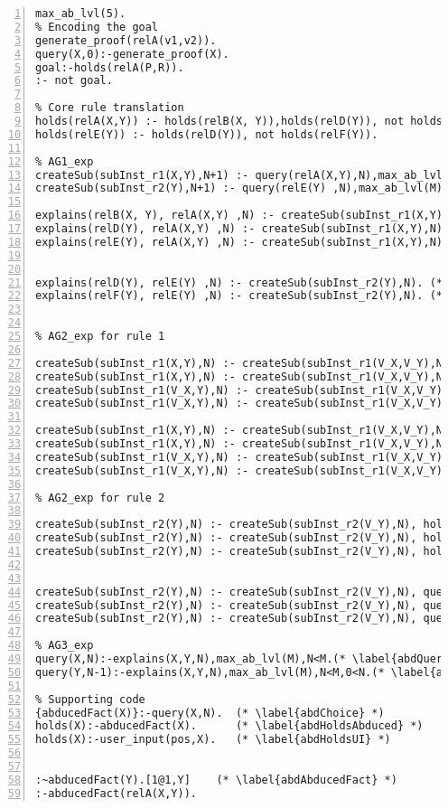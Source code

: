 \documentclass[sigconf]{acmart}
\begin{document}
\begin{lstlisting}[numbers=left]
max_ab_lvl(5).
% Encoding the goal
generate_proof(relA(v1,v2)).
query(X,0):-generate_proof(X).
goal:-holds(relA(P,R)).
:- not goal.

% Core rule translation
holds(relA(X,Y)) :- holds(relB(X, Y)),holds(relD(Y)), not holds(relE(Y)).
holds(relE(Y)) :- holds(relD(Y)), not holds(relF(Y)).

% AG1_exp
createSub(subInst_r1(X,Y),N+1) :- query(relA(X,Y),N),max_ab_lvl(M),N<M-1. (* \label{abdInstR1} *)
createSub(subInst_r2(Y),N+1) :- query(relE(Y) ,N),max_ab_lvl(M),N<M-1. (* \label{abdInstR2} *)

explains(relB(X, Y), relA(X,Y) ,N) :- createSub(subInst_r1(X,Y),N). (* \label{abdExplR1start} *)
explains(relD(Y), relA(X,Y) ,N) :- createSub(subInst_r1(X,Y),N).
explains(relE(Y), relA(X,Y) ,N) :- createSub(subInst_r1(X,Y),N). (* \label{abdExplR1end} *)


explains(relD(Y), relE(Y) ,N) :- createSub(subInst_r2(Y),N). (* \label{abdExplR2start} *)
explains(relF(Y), relE(Y) ,N) :- createSub(subInst_r2(Y),N). (* \label{abdExplR2end} *)


% AG2_exp for rule 1

createSub(subInst_r1(X,Y),N) :- createSub(subInst_r1(V_X,V_Y),N), holds(relA(X,Y)).
createSub(subInst_r1(X,Y),N) :- createSub(subInst_r1(V_X,V_Y),N), holds(relB(X,Y)).
createSub(subInst_r1(V_X,Y),N) :- createSub(subInst_r1(V_X,V_Y),N), holds(relD(Y)).
createSub(subInst_r1(V_X,Y),N) :- createSub(subInst_r1(V_X,V_Y),N), holds(relE(Y)).

createSub(subInst_r1(X,Y),N) :- createSub(subInst_r1(V_X,V_Y),N), query(relA(X,Y),N-1),0<N.
createSub(subInst_r1(X,Y),N) :- createSub(subInst_r1(V_X,V_Y),N), query(relB(X,Y),N).
createSub(subInst_r1(V_X,Y),N) :- createSub(subInst_r1(V_X,V_Y),N), query(relD(Y),N).
createSub(subInst_r1(V_X,Y),N) :- createSub(subInst_r1(V_X,V_Y),N), query(relE(Y),N).

% AG2_exp for rule 2

createSub(subInst_r2(Y),N) :- createSub(subInst_r2(V_Y),N), holds(relE(Y)).
createSub(subInst_r2(Y),N) :- createSub(subInst_r2(V_Y),N), holds(relD(Y)).
createSub(subInst_r2(Y),N) :- createSub(subInst_r2(V_Y),N), holds(relF(Y)).


createSub(subInst_r2(Y),N) :- createSub(subInst_r2(V_Y),N), query(relE(Y),N-1),0<N.
createSub(subInst_r2(Y),N) :- createSub(subInst_r2(V_Y),N), query(relD(Y),N).
createSub(subInst_r2(Y),N) :- createSub(subInst_r2(V_Y),N), query(relF(Y),N).

% AG3_exp
query(X,N):-explains(X,Y,N),max_ab_lvl(M),N<M.(* \label{abdQuery} *)
query(Y,N-1):-explains(X,Y,N),max_ab_lvl(M),N<M,0<N.(* \label{abdAbdHold} *)

% Supporting code
{abducedFact(X)}:-query(X,N).  (* \label{abdChoice} *)
holds(X):-abducedFact(X).      (* \label{abdHoldsAbduced} *)
holds(X):-user_input(pos,X).   (* \label{abdHoldsUI} *)


:~abducedFact(Y).[1@1,Y]    (* \label{abdAbducedFact} *)
:-abducedFact(relA(X,Y)).

\end{lstlisting}
\end{document}

